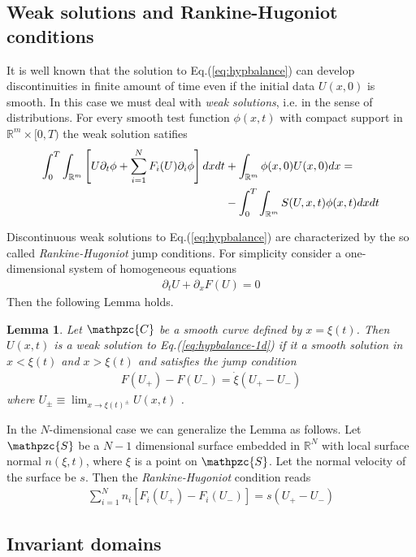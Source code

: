 \documentclass[11pt, reqno]{amsart}
\newcommand{\eqr}[1]{Eq.\thinspace(#1)}
\newcommand{\spfrac}[2]{{\partial_{#1}} {#2}}
\newcommand{\script}[1]{\mathpzc{#1}}
\newtheorem{lem}{Lemma}
\theoremstyle{definition}
\begin{document}
\subsection{Weak solutions and Rankine-Hugoniot conditions}

It is well known that the solution to \eqr{\ref{eq:hypbalance}} can
develop discontinuities in finite amount of time even if the initial
data $U(x,0)$ is smooth. In this case we must deal with \emph{weak
  solutions}, i.e. in the sense of distributions. For every smooth
test function $\phi(x,t)$ with compact support in
$\mathbb{R}^m\times[0,T)$ the weak solution satifies
\begin{align}
  \int_0^T\int_{\mathbb{R}^m}
  \left[
    U\spfrac{t}{\phi}
    +
    \sum_{i=1}^N F_i(U)\spfrac{i}{\phi}
  \right]
  dx dt
  &+
  \int_{\mathbb{R}^m}
  \phi(x,0)U(x,0) dx
  = \notag \\
  &-
  \int_0^T\int_{\mathbb{R}^m}
  S(U,x,t)\phi(x,t)
  dx dt  
\end{align}

Discontinuous weak solutions to \eqr{\ref{eq:hypbalance}} are
characterized by the so called \emph{Rankine-Hugoniot} jump
conditions. For simplicity consider a one-dimensional system of
homogeneous equations
\begin{align}
  \spfrac{t}{U} + \spfrac{x}{F(U)} = 0
  \label{eq:hypbalance-1d}
\end{align}
Then the following Lemma holds.
\begin{lem}
  Let $\script{C}$ be a smooth curve defined by $x=\xi(t)$. Then
  $U(x,t)$ is a \emph{weak} solution to \eqr{\ref{eq:hypbalance-1d}}
  if it a smooth solution in $x<\xi(t)$ and $x>\xi(t)$ and satisfies
  the jump condition
  \begin{align}
    F(U_+) - F(U_-) = \dot{\xi}(U_+ - U_-)
  \end{align}
  where $U_\pm \equiv \lim_{x\rightarrow \xi(t)^\pm}U(x,t)$ .
\end{lem}

In the $N$-dimensional case we can generalize the Lemma as
follows. Let $\script{S}$ be a $N-1$ dimensional surface embedded in
$\mathbb{R}^N$ with local surface normal $n(\xi,t)$, where $\xi$ is a
point on $\script{S}$. Let the normal velocity of the surface be
$s$. Then the \emph{Rankine-Hugoniot} condition reads
\begin{align}
  \sum_{i=1}^N 
  n_i[F_i(U_+) - F_i(U_-)] = s(U_+ - U_-)
\end{align}

\subsection{Invariant domains}
\end{document}
